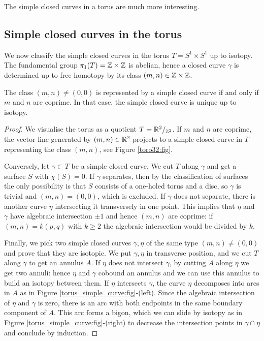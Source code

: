 The simple closed curves in a torus are much more interesting.

\subsection{Simple closed curves in the torus}
We now classify the simple closed curves in the torus $T=S^1\times S^1$ up to isotopy. The fundamental group $\pi_1(T) = \mathbb{Z}\times \mathbb{Z}$ is abelian, hence a closed curve $\gamma$ is determined up to free homotopy by its class $(m,n)\in\mathbb{Z}\times\mathbb{Z}$.

\begin{prop} \label{mn:prop}
The class $(m,n)\neq (0,0)$ is represented by a simple closed curve if and only if 
$m$ and $n$ are coprime. In that case, the simple closed curve is unique up to isotopy.
\end{prop}
\begin{proof}
We visualise the torus as a quotient $T = \mathbb{R}^2/_{\mathbb{Z}^2}$. If $m$ and $n$ are coprime, the vector line generated by $(m,n)\in \mathbb{R}^2$ projects to a simple closed curve in $T$ representing the class $(m,n)$, see Figure \ref{toro32:fig}. 

Conversely, let $\gamma\subset T$ be a simple closed curve. We cut $T$ along $\gamma$ and get a surface $S$ with $\chi(S) =0$. If $\gamma$ separates, then by the classification of surfaces the only possibility is that $S$ consists of a one-holed torus and a disc, so $\gamma$ is trivial and $(m,n)=(0,0)$, which is excluded. If $\gamma$ does not separate, there is another curve $\eta$ intersecting it transversely in one point. This implies that $\eta$ and $\gamma$ have algebraic intersection $\pm 1$ and hence $(m,n)$ are coprime: if $(m,n) = k(p,q)$ with $k\geqslant 2$ the algebraic intersection would be divided by $k$.

Finally, we pick two simple closed curves $\gamma, \eta$ of the same type $(m,n)\neq (0,0)$ and prove that they are isotopic. We put $\gamma, \eta$ in transverse position, and we cut $T$ along $\gamma$ to get an annulus $A$. If $\eta$ does not intersect $\gamma$, by cutting $A$ along $\eta$ we get two annuli: hence $\eta$ and $\gamma$ cobound an annulus and we can use this annulus to build an isotopy between them. If $\eta$ intersects $\gamma$, the curve $\eta$ decomposes into arcs in $A$ as in Figure \ref{torus_simple_curve:fig}-(left). Since the algebraic intersection of $\eta$ and $\gamma$ is zero, there is an arc with both endpoints in the same boundary component of $A$. This arc forms a bigon, which we can slide by isotopy as in Figure \ref{torus_simple_curve:fig}-(right) to decrease the intersection points in $\gamma \cap \eta$ and conclude by induction.
\end{proof}

